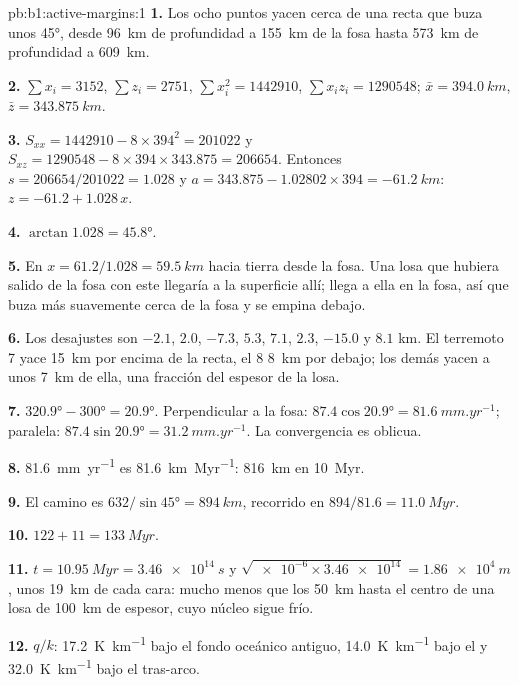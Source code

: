 \begin{solution}{pb:b1:active-margins:1}
\textbf{1.} Los ocho puntos yacen cerca de una recta que buza unos
\ang{45}, desde \qty{96}{km} de profundidad a \qty{155}{km} de la fosa hasta
\qty{573}{km} de profundidad a \qty{609}{km}.

\textbf{2.} $\sum x_i = 3152$, $\sum z_i = 2751$, $\sum x_i^2 = \num{1442910}$,
$\sum x_i z_i = \num{1290548}$; $\bar x = \qty{394.0}{km}$,
$\bar z = \qty{343.875}{km}$.

\textbf{3.} $S_{xx} = 1442910 - 8\times394^2 = \num{201022}$ y
$S_{xz} = 1290548 - 8\times394\times343.875 = \num{206654}$. Entonces
$s = 206654/201022 = 1.028$ y $a = 343.875 - 1.02802\times394 =
\qty{-61.2}{km}$: $z = -61.2 + 1.028\,x$.

\textbf{4.} $\arctan1.028 = \ang{45.8}$.

\textbf{5.} En $x = 61.2/1.028 = \qty{59.5}{km}$ hacia tierra desde la fosa. Una losa que hubiera salido de la fosa con este 
llegaría a la superficie allí; llega a ella en la fosa, así que buza más suavemente cerca de la fosa y se empina debajo.

\textbf{6.} Los desajustes son $-2.1$, $2.0$, $-7.3$, $5.3$, $7.1$, $2.3$,
$-15.0$ y $8.1$ \unit{km}. El terremoto 7 yace \qty{15}{km} por encima de la recta, el 8
\qty{8}{km} por debajo; los demás yacen a unos \qty{7}{km} de ella, una fracción
del espesor de la losa.

\textbf{7.} $\ang{320.9} - \ang{300} = \ang{20.9}$. Perpendicular a la
fosa: $87.4\cos\ang{20.9} = \qty{81.6}{mm.yr^{-1}}$; paralela:
$87.4\sin\ang{20.9} = \qty{31.2}{mm.yr^{-1}}$. La convergencia es oblicua.

\textbf{8.} \qty{81.6}{mm.yr^{-1}} es \qty{81.6}{km.Myr^{-1}}: \qty{816}{km} en
\qty{10}{Myr}.

\textbf{9.} El camino es $632/\sin\ang{45} = \qty{894}{km}$, recorrido en
$894/81.6 = \qty{11.0}{Myr}$.

\textbf{10.} $122 + 11 = \qty{133}{Myr}$.

\textbf{11.} $t = \qty{10.95}{Myr} = \qty{3.46e14}{s}$ y
$\sqrt{\num{e-6}\times\num{3.46e14}} = \qty{1.86e4}{m}$, unos \qty{19}{km}
de cada cara: mucho menos que los \qty{50}{km} hasta el centro de una losa de
\qty{100}{km} de espesor, cuyo núcleo sigue frío.

\textbf{12.} $q/k$: \qty{17.2}{K.km^{-1}} bajo el fondo oceánico antiguo,
\qty{14.0}{K.km^{-1}} bajo el  y \qty{32.0}{K.km^{-1}} bajo el
tras-arco.


\end{solution}
